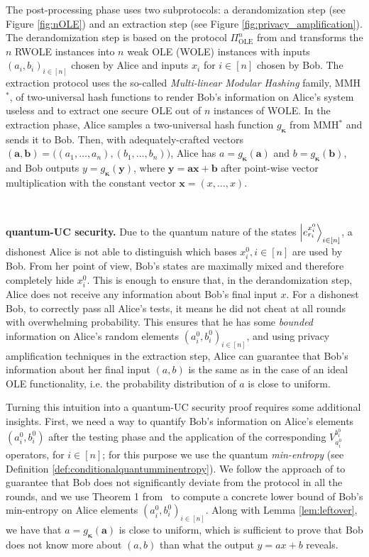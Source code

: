 The post-processing phase uses two subprotocols: a derandomization step (see Figure \ref{fig:nOLE}) and an extraction step (see Figure \ref{fig:privacy_amplification}). The derandomization step is based on the protocol $\Pi^n_{\text{OLE}}$ from \cite{DHNO19} and transforms the $n$ RWOLE instances into $n$ weak OLE (WOLE) instances with inputs $(a_i, b_i)_{i\in [n]}$ chosen by Alice and inputs $x_i$ for $i\in [n]$ chosen by Bob. The extraction protocol uses the so-called \textit{Multi-linear Modular Hashing} family, MMH$^*$, of two-universal hash functions \cite{HK97} to render Bob's information on Alice's system useless and to extract one secure OLE out of $n$ instances of WOLE. In the extraction phase, Alice samples a two-universal hash function $g_{\bm{\kappa}}$ from MMH$^*$ and sends it to Bob. Then, with adequately-crafted vectors $(\bm{a}, \bm{b}) = \big( (a_1, \ldots, a_n), (b_1, \ldots, b_n) \big)$, Alice has $a = g_{\bm{\kappa}}(\bm{a})$ and $b = g_{\bm{\kappa}}(\bm{b})$, and Bob outputs $y = g_{\bm{\kappa}}(\bm{y})$, where $\bm{y} = \bm{a} \bm{x} + \bm{b}$ after point-wise vector multiplication with the constant vector $\bm{x} = (x, \ldots, x)$. 



\


\noindent\textbf{quantum-UC security.} %
Due to the quantum nature of the states $\ket{e^{x^0_i}_{r_i}}_{i\in [n]}$, a dishonest Alice is not able to distinguish which bases $x^0_i, i\in [n]$ are used by Bob. From her point of view, Bob's states are maximally mixed and therefore completely hide $x^0_i$. This is enough to ensure that, in the derandomization step, Alice does not receive any information about Bob's final input $x$. For a dishonest Bob, to correctly pass all Alice's tests, it means he did not cheat at all rounds with overwhelming probability. This ensures that he  has some \textit{bounded} information on Alice's random elements $(a^0_i, b^0_i)_{i\in [n]}$, and using privacy amplification techniques in the extraction step, Alice can guarantee that Bob's information about her final input $(a,b)$ is the same as in the case of an ideal OLE functionality, i.e. the probability distribution of $a$ is close to uniform.

Turning this intuition into a quantum-UC security proof requires some additional insights. First, we need a way to quantify Bob's information on Alice's elements $(a^0_i, b^0_i)$ after the testing phase and the application of the corresponding $V^{b^0_i}_{a^0_i}$  operators, for $ i\in [n]$; for this purpose we use the quantum \textit{min-entropy} (see Definition \ref{def:conditionalquantumminentropy}). We follow the approach of \cite{DFLSS09} to guarantee that Bob does not significantly deviate from the protocol in all the rounds, and we use Theorem 1 from~\cite{Dupuis2015} to compute a concrete lower bound of Bob's min-entropy on Alice elements $(a^0_i, b^0_i)_{i\in [n]}$. Along with Lemma \ref{lem:leftover}, we have that $a = g_{\bm{\kappa}}(\bm{a})$ is close to uniform, which is sufficient to prove that Bob does not know more about $(a,b)$ than what the output $y = ax + b$ reveals. 

